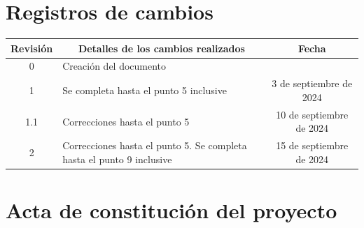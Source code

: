 \documentclass[
11pt, %
]{charter}
\begin{document}
\maketitle
\thispagestyle{empty}
\pagebreak


\thispagestyle{empty}
{\setlength{\parskip}{0pt}
	\tableofcontents{}
}
\pagebreak


\section*{Registros de cambios}
\label{sec:registro}


\begin{table}[ht]
	\label{tab:registro}
	\centering
	\begin{tabularx}{\linewidth}{@{}|c|X|c|@{}}
		\hline
		\rowcolor[HTML]{C0C0C0}
		Revisión & \multicolumn{1}{c|}{\cellcolor[HTML]{C0C0C0}Detalles de los cambios realizados} & Fecha            \\ \hline
		0        & Creación del documento                                                          & \fechaInicioName \\ \hline
		1        & Se completa hasta el punto 5 inclusive                & {3} de {septiembre} de 2024 \\ \hline
		1.1      & Correcciones hasta el punto 5				 		 & {10} de {septiembre} de 2024 \\ \hline
		2        & Correcciones hasta el punto 5. 
				   Se completa hasta el punto 9 inclusive				 & {15} de {septiembre} de 2024 \\ \hline

	\end{tabularx}
\end{table}

\pagebreak



\section*{Acta de constitución del proyecto}
\label{sec:acta}
\end{document}
